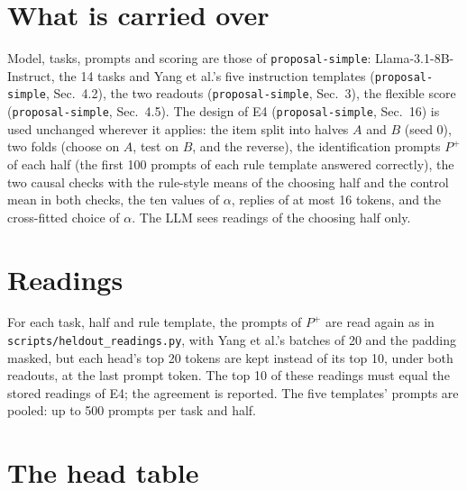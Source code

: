 \documentclass[11pt,a4paper]{article}
\newcommand{\simple}[1]{\texttt{proposal-simple}, #1}
\begin{document}
\section{What is carried over}\label{sec:carried}

Model, tasks, prompts and scoring are those of \texttt{proposal-simple}: Llama-3.1-8B-Instruct, the 14 tasks and Yang et al.'s five instruction templates (\simple{Sec.~4.2}), the two readouts (\simple{Sec.~3}), the flexible score (\simple{Sec.~4.5}). The design of E4 (\simple{Sec.~16}) is used unchanged wherever it applies: the item split into halves $A$ and $B$ (seed 0), two folds (choose on $A$, test on $B$, and the reverse), the identification prompts $P^+$ of each half (the first 100 prompts of each rule template answered correctly), the two causal checks with the rule-style means of the choosing half and the control mean in both checks, the ten values of $\alpha$, replies of at most 16 tokens, and the cross-fitted choice of $\alpha$. The LLM sees readings of the choosing half only.

\section{Readings}\label{sec:readings}

For each task, half and rule template, the prompts of $P^+$ are read again as in \texttt{scripts/\allowbreak heldout\_readings.py}, with Yang et al.'s batches of 20 and the padding masked, but each head's top 20 tokens are kept instead of its top 10, under both readouts, at the last prompt token. The top 10 of these readings must equal the stored readings of E4; the agreement is reported. The five templates' prompts are pooled: up to 500 prompts per task and half.

\section{The head table}\label{sec:table}
\end{document}
